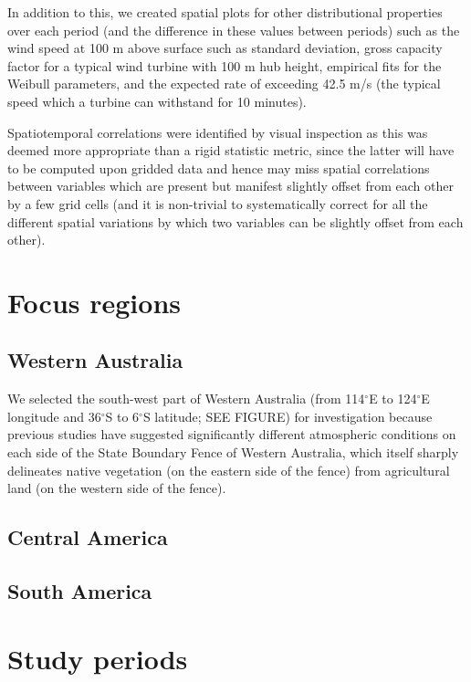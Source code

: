 In addition to this, we created spatial plots for other distributional properties over each period (and the difference in these values between periods) such as the wind speed at 100 m above surface such as standard deviation, gross capacity factor for a typical wind turbine with 100 m hub height, empirical fits for the Weibull parameters, and the expected rate of exceeding 42.5 m/s (the typical speed which a turbine can withstand for 10 minutes).

Spatiotemporal correlations were identified by visual inspection as this was deemed more appropriate than a rigid statistic metric, since the latter will have to be computed upon gridded data and hence may miss spatial correlations between variables which are present but manifest slightly offset from each other by a few grid cells (and it is non-trivial to systematically correct for all the different spatial variations by which two variables can be slightly offset from each other).

\section{Focus regions}

\subsection{Western Australia}

We selected the south-west part of Western Australia (from 114$^\circ$E to 124$^\circ$E longitude and 36$^\circ$S to 6$^\circ$S latitude; SEE FIGURE) for investigation because previous studies have suggested significantly different atmospheric conditions on each side of the State Boundary Fence of Western Australia, which itself sharply delineates native vegetation (on the eastern side of the fence) from agricultural land (on the western side of the fence). 

\subsection{Central America}

\subsection{South America}

\section{Study periods}


